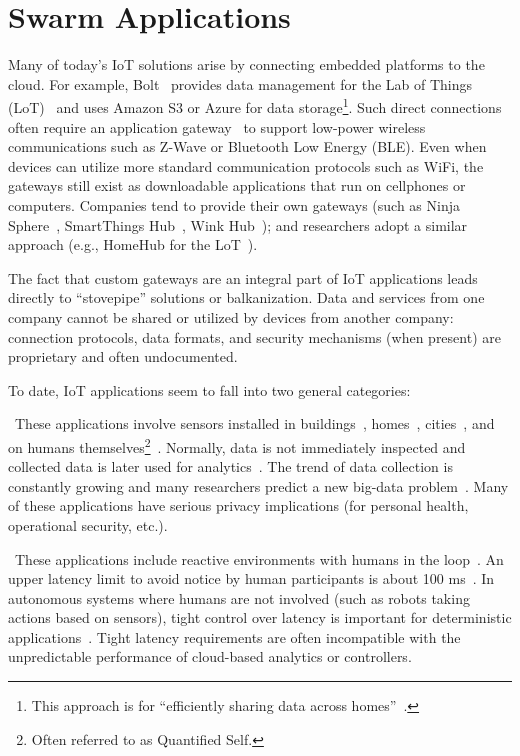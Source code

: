 
\section{Swarm Applications}
\label{sec:swarm-applications}

Many of today's IoT solutions arise by connecting embedded platforms to the
cloud.  For example, Bolt~\cite{gupta2014bolt} provides data management for the
Lab of Things (LoT)~\cite{brush2013lab} and uses Amazon S3 or Azure for data
storage\footnote{This approach is for ``efficiently sharing data across
  homes''~\cite{gupta2014bolt}.}.  Such direct connections often require an
application gateway~\cite{zachariah1001internet} to support low-power wireless
communications such as Z-Wave or Bluetooth Low Energy (BLE).  Even when devices
can utilize more standard communication protocols such as WiFi, the gateways
still exist as downloadable applications that run on cellphones or computers.
Companies tend to provide their own gateways (such as Ninja Sphere~\cite{ninja},
SmartThings Hub~\cite{smartthings}, Wink Hub~\cite{wink}); and researchers adopt
a similar approach (e.g., HomeHub for the LoT~\cite{brush2013lab}).

The fact that custom gateways are an integral part of IoT applications leads
directly to ``stovepipe'' solutions or balkanization. Data and services from one
company cannot be shared or utilized by devices from another company: connection
protocols, data formats, and security mechanisms (when present) are proprietary
and often undocumented.

To date, IoT applications seem to fall into two general categories:

~These applications involve sensors
installed in buildings~\cite{dawson2010smap}, homes~\cite{hnat2011hitchhiker},
cities~\cite{sfpark}, and on humans themselves\footnote{Often referred to as
  Quantified Self.}~\cite{fitbit, swan2013quantified}.  Normally, data is not
immediately inspected and collected data is later used for
analytics~\cite{kolter2011redd}.  The trend of data collection is constantly
growing and many researchers predict a new big-data problem~\cite{diaz2012big,
  zaslavsky2013sensing}.  Many of these applications have serious privacy
implications (for personal health, operational security, etc.).

~These applications
include reactive environments with humans in the
loop~\cite{cooperstock1997reactive}.
An upper latency limit to avoid notice by human participants is about
100 ms~\cite{nielsen1994usability}.  In autonomous systems where humans
are not involved (such as robots taking actions based on sensors), tight
control over latency is important for deterministic
applications~\cite{eidson2012distributed}.  Tight
latency requirements are often incompatible with the unpredictable
performance of cloud-based analytics or controllers.

